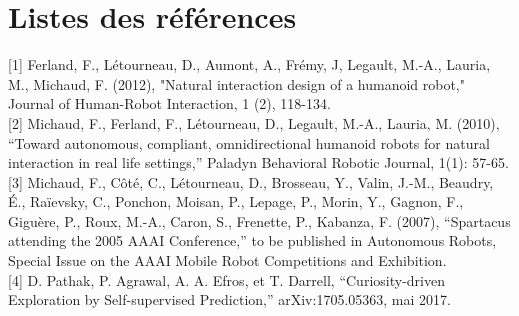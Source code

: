 \documentclass[letterpaper, 12pt]{article}
\begin{document}
    \pagebreak
    \section{Listes des références}
    [1]     Ferland, F., Létourneau, D., Aumont, A., Frémy, J, Legault, M.-A., Lauria, M., Michaud,         F. (2012), "Natural interaction design of a humanoid robot," Journal of Human-Robot         Interaction, 1 (2), 118-134.\\
    
    [2]    Michaud, F., Ferland, F., Létourneau, D., Legault, M.-A., Lauria, M. (2010), “Toward         autonomous, compliant, omnidirectional humanoid robots for natural interaction in real         life settings,” Paladyn Behavioral Robotic Journal, 1(1): 57-65.\\
    
    [3]    Michaud, F., Côté, C., Létourneau, D., Brosseau, Y., Valin, J.-M., Beaudry, É.,             Raïevsky, C., Ponchon, Moisan, P., Lepage, P., Morin, Y., Gagnon, F., Giguère, P.,             Roux, M.-A., Caron, S., Frenette, P., Kabanza, F. (2007), “Spartacus attending the             2005 AAAI Conference,” to be published in Autonomous Robots, Special Issue on the         AAAI Mobile Robot Competitions and Exhibition.\\
    
    [4]    D. Pathak, P. Agrawal, A. A. Efros, et T. Darrell, “Curiosity-driven Exploration by             Self-supervised Prediction,” arXiv:1705.05363, mai 2017.\\\\
    
        
    \pagebreak
    
    \singlespacing
    \renewcommand{\refname}{Bibliographie}
    
    
\end{document}
